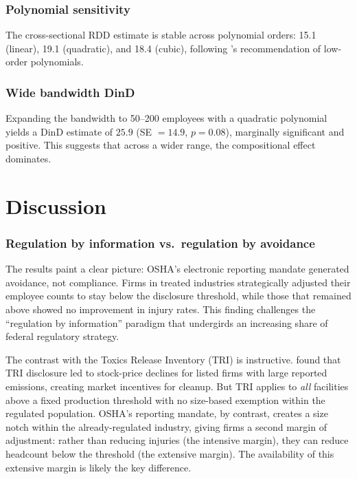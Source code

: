 \documentclass[12pt]{article}
\begin{document}
\subsubsection*{Polynomial sensitivity} The cross-sectional RDD estimate is stable across polynomial orders: 15.1 (linear), 19.1 (quadratic), and 18.4 (cubic), following \citet{gelman2019}'s recommendation of low-order polynomials.

\subsubsection*{Wide bandwidth DinD} Expanding the bandwidth to 50--200 employees with a quadratic polynomial yields a DinD estimate of $25.9$ (SE $= 14.9$, $p = 0.08$), marginally significant and positive. This suggests that across a wider range, the compositional effect dominates.


\section{Discussion}\label{sec:discussion}

\subsubsection*{Regulation by information vs.\ regulation by avoidance} The results paint a clear picture: OSHA's electronic reporting mandate generated avoidance, not compliance. Firms in treated industries strategically adjusted their employee counts to stay below the disclosure threshold, while those that remained above showed no improvement in injury rates. This finding challenges the ``regulation by information'' paradigm that undergirds an increasing share of federal regulatory strategy.

The contrast with the Toxics Release Inventory (TRI) is instructive. \citet{hamilton1995} found that TRI disclosure led to stock-price declines for listed firms with large reported emissions, creating market incentives for cleanup. But TRI applies to \textit{all} facilities above a fixed production threshold with no size-based exemption within the regulated population. OSHA's reporting mandate, by contrast, creates a size notch within the already-regulated industry, giving firms a second margin of adjustment: rather than reducing injuries (the intensive margin), they can reduce headcount below the threshold (the extensive margin). The availability of this extensive margin is likely the key difference.
\end{document}
